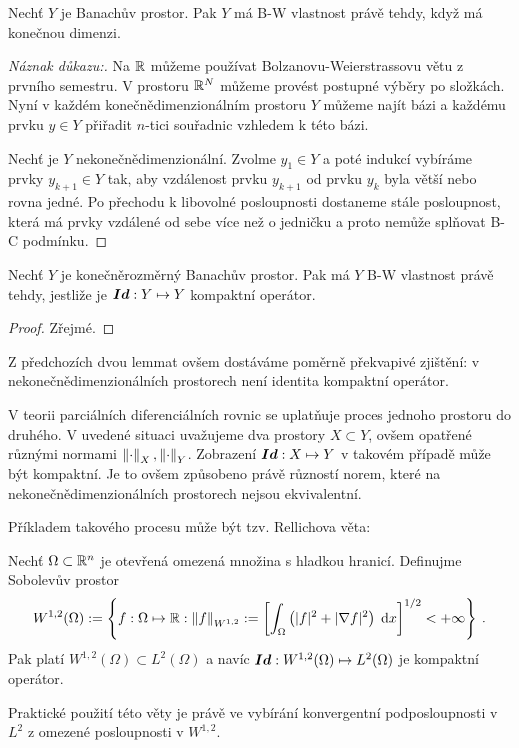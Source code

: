 \begin{lemma}
Nechť $Y$ je Banachův prostor. Pak $Y$ má B-W vlastnost právě tehdy, když má konečnou dimenzi.
\end{lemma}
\begin{proof}[Náznak důkazu:]
\uv{$\Leftarrow$} Na $\mathbb{R}$ můžeme používat Bolzanovu-Weierstrassovu větu z prvního semestru. V prostoru $\mathbb{R}^N$ můžeme provést postupné výběry po složkách. Nyní v každém konečnědimenzionálním prostoru $Y$ můžeme najít bázi a každému prvku $y \in Y$ přiřadit $n$-tici souřadnic vzhledem k této bázi. 

\uv{$\Rightarrow$} Nechť je $Y$ nekonečnědimenzionální. Zvolme $y_1 \in Y$ a poté indukcí vybíráme prvky $y_{k+1} \in Y$ tak, aby vzdálenost prvku $y_{k+1}$ od prvku $y_k$ byla větší nebo rovna jedné. Po přechodu k libovolné posloupnosti dostaneme stále posloupnost, která má prvky vzdálené od sebe více než o jedničku a proto nemůže splňovat B-C podmínku.
\end{proof}

\begin{lemma} \label{3.kompaktnost identity}
Nechť $Y$ je konečněrozměrný Banachův prostor. Pak má $Y$ B-W vlastnost právě tehdy, jestliže je $\boldsymbol{Id} : Y \mapsto Y$ kompaktní operátor.
\end{lemma}
\begin{proof}
Zřejmé.
\end{proof}

Z předchozích dvou lemmat ovšem dostáváme poměrně překvapivé zjištění: v nekonečnědimenzionálních prostorech není identita kompaktní operátor.

\begin{remark}
V teorii parciálních diferenciálních rovnic se uplatňuje proces  jednoho prostoru do druhého. V uvedené situaci uvažujeme dva prostory $ X \subset Y$, ovšem opatřené různými normami $\left\lVert\cdot\right\rVert_X, \left\lVert\cdot\right\rVert_Y$. Zobrazení $\boldsymbol{Id} : X \mapsto Y$ v takovém případě může být kompaktní. Je to ovšem způsobeno právě růzností norem, které na nekonečnědimenzionálních prostorech nejsou ekvivalentní.

Příkladem takového procesu může být tzv. Rellichova věta:

Nechť $\Omega \subset \mathbb{R}^n$ je otevřená omezená množina s hladkou hranicí. Definujme Sobolevův prostor \begin{align*}
    W^{1,2}(\Omega) := \left \lbrace f: \Omega \mapsto \mathbb{R} : \left\lVert f\right\rVert_{W^{1,2}} := \left[ \int_\Omega \left( |f|^2 + |\nabla f|^2 \right) \;\mathrm{d}x \right]^{1/2} < + \infty \right \rbrace \:.
\end{align*}
Pak platí $W^{1,2}(\Omega) \subset L^2(\Omega)$ a navíc $\boldsymbol{Id} : W^{1,2}(\Omega) \mapsto L^2(\Omega)$ je kompaktní operátor.

Praktické použití této věty je právě ve vybírání konvergentní podposloupnosti v $L^2$ z omezené posloupnosti v $W^{1,2}$.
\end{remark}

